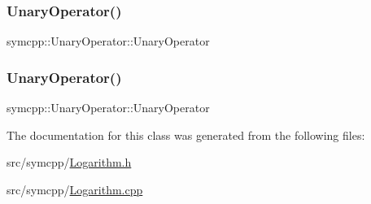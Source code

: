 \subsubsection{\texorpdfstring{UnaryOperator()}{UnaryOperator()}\hspace{0.1cm}{\footnotesize\ttfamily [1/2]}}
{\footnotesize\ttfamily symcpp\+::\+Unary\+Operator\+::\+Unary\+Operator\hspace{0.3cm}{\ttfamily [inline]}}

\mbox{\label{classsymcpp_1_1Logarithm_a23a8172db96675ebf1114f4f3f41b6f1}} 
\subsubsection{\texorpdfstring{UnaryOperator()}{UnaryOperator()}\hspace{0.1cm}{\footnotesize\ttfamily [2/2]}}
{\footnotesize\ttfamily symcpp\+::\+Unary\+Operator\+::\+Unary\+Operator\hspace{0.3cm}{\ttfamily [inline]}}



The documentation for this class was generated from the following files\+:\begin{DoxyCompactItemize}
\item 
src/symcpp/\mbox{\hyperlink{Logarithm_8h}{Logarithm.\+h}}\item 
src/symcpp/\mbox{\hyperlink{Logarithm_8cpp}{Logarithm.\+cpp}}\end{DoxyCompactItemize}
